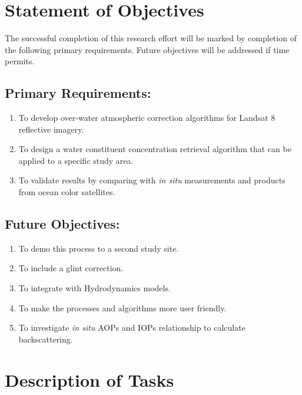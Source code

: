 \section{Statement of Objectives}
\label{sec:objectives}
The successful completion of this research effort will be marked by completion of the following primary requirements. Future objectives will be addressed if time permits.

\subsection{Primary Requirements:}
\begin{enumerate}
	\item To develop over-water atmospheric correction algorithms for Landsat 8 reflective imagery.
	\item To design a water constituent concentration retrieval algorithm that can be applied to a specific study area.
	\item To validate results by comparing with {\it in situ} measurements and products from ocean color satellites.
\end{enumerate}

\subsection{Future Objectives:}
\begin{enumerate}
	\item To demo this process to a second study site.
	\item To include a glint correction.
	\item To integrate with Hydrodynamics models.
	\item To make the processes and algorithms more user friendly.
	\item To investigate {\it in situ} AOPs and IOPs relationship to calculate backscattering.
\end{enumerate}
\section{Description of Tasks}
\label{sec:tasks}

